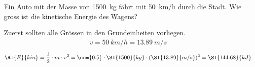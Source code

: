 
\begin{aufgabe}
	Ein Auto mit der Masse von \SI{1500}{kg} fährt mit \SI{50}{km/h} durch die Stadt.
	Wie gross ist die kinetische Energie des Wagens?
	\begin{loesung}
		Zuerst sollten alle Grössen in den Grundeinheiten vorliegen.
		\begin{eqnarray*}
			v=\SI{50}{km/h}=\SI{13.89}{m/s}
		\end{eqnarray*}
		\begin{eqnarray*}
			\RI{E}{kin}=\frac{1}{2}\cdot m\cdot v^2=\num{0.5}\cdot\SI{1500}{kg}\cdot(\SI{13.89}{m/s})^2=\SI{144.68}{kJ}
		\end{eqnarray*}
	\end{loesung}
\end{aufgabe}
